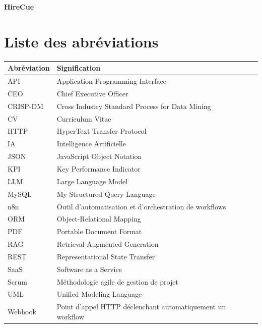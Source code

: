 \documentclass[12pt,a4paper]{report}
\begin{document}
\hypersetup{pageanchor=false}

\begin{titlepage}

    {\Huge\bfseries HireCue\par}
    \vspace{0.4cm}
    
\end{titlepage}

\thispagestyle{empty}



\newpage
\tableofcontents
\newpage
\listoffigures
\newpage
\listoftables
\newpage
\chapter*{Liste des abr\'eviations}
\begin{table}[H]
\centering
\renewcommand{\arraystretch}{1.3}
\begin{tabular}{|p{4cm}|p{10cm}|}
\hline
\rowcolor{TableHeaderBlue}
\textbf{Abr\'eviation} & \textbf{Signification} \\
\hline
API & Application Programming Interface \\
\hline
CEO & Chief Executive Officer \\
\hline
CRISP-DM & Cross Industry Standard Process for Data Mining \\
\hline
CV & Curriculum Vitae \\
\hline
HTTP & HyperText Transfer Protocol \\
\hline
IA & Intelligence Artificielle \\
\hline
JSON & JavaScript Object Notation \\
\hline
KPI & Key Performance Indicator \\
\hline
LLM & Large Language Model \\
\hline
MySQL & My Structured Query Language \\
\hline
n8n & Outil d'automatisation et d'orchestration de workflows \\
\hline
ORM & Object-Relational Mapping \\
\hline
PDF & Portable Document Format \\
\hline
RAG & Retrieval-Augmented Generation \\
\hline
REST & Representational State Transfer \\
\hline
SaaS & Software as a Service \\
\hline
Scrum & Méthodologie agile de gestion de projet \\
\hline
UML & Unified Modeling Language \\
\hline
Webhook & Point d'appel HTTP déclenchant automatiquement un workflow \\
\hline
\end{tabular}
\end{table}
\end{document}
